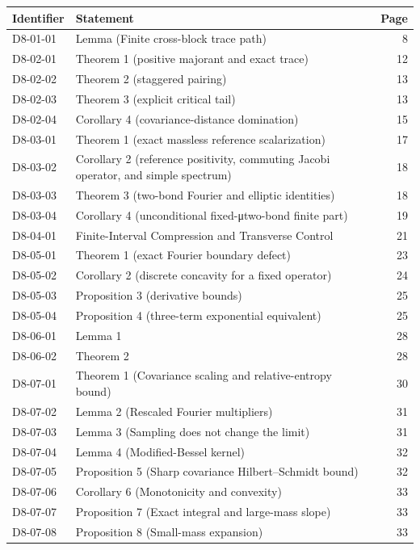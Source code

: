 \documentclass[11pt,a4paper]{article}
\begin{document}
{\footnotesize\begin{longtable}{@{}l>{\raggedright\arraybackslash}p{}r@{}}
\toprule Identifier & Statement & Page\\\midrule\endhead
D8-01-01 & Lemma (Finite cross-block trace path) & 8\\
D8-02-01 & Theorem 1 (positive majorant and exact trace) & 12\\
D8-02-02 & Theorem 2 (staggered pairing) & 13\\
D8-02-03 & Theorem 3 (explicit critical tail) & 13\\
D8-02-04 & Corollary 4 (covariance-distance domination) & 15\\
D8-03-01 & Theorem 1 (exact massless reference scalarization) & 17\\
D8-03-02 & Corollary 2 (reference positivity, commuting Jacobi operator, and simple spectrum) & 18\\
D8-03-03 & Theorem 3 (two-bond Fourier and elliptic identities) & 18\\
D8-03-04 & Corollary 4 (unconditional fixed-μtwo-bond finite part) & 19\\
D8-04-01 & Finite-Interval Compression and Transverse Control & 21\\
D8-05-01 & Theorem 1 (exact Fourier boundary defect) & 23\\
D8-05-02 & Corollary 2 (discrete concavity for a fixed operator) & 24\\
D8-05-03 & Proposition 3 (derivative bounds) & 25\\
D8-05-04 & Proposition 4 (three-term exponential equivalent) & 25\\
D8-06-01 & Lemma 1 & 28\\
D8-06-02 & Theorem 2 & 28\\
D8-07-01 & Theorem 1 (Covariance scaling and relative-entropy bound) & 30\\
D8-07-02 & Lemma 2 (Rescaled Fourier multipliers) & 31\\
D8-07-03 & Lemma 3 (Sampling does not change the limit) & 31\\
D8-07-04 & Lemma 4 (Modified-Bessel kernel) & 32\\
D8-07-05 & Proposition 5 (Sharp covariance Hilbert–Schmidt bound) & 32\\
D8-07-06 & Corollary 6 (Monotonicity and convexity) & 33\\
D8-07-07 & Proposition 7 (Exact integral and large-mass slope) & 33\\
D8-07-08 & Proposition 8 (Small-mass expansion) & 33\\

\end{longtable}}
\end{document}
